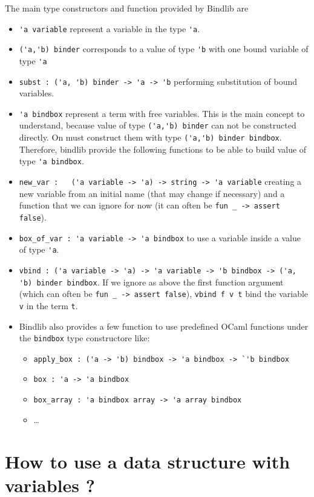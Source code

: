 \documentclass[11pt]{article}
\begin{document}
The main type constructors and function provided by Bindlib are
\begin{itemize}
\item \verb#'a variable# represent a variable in the type \verb#'a#.
\item \verb#('a,'b) binder# corresponds to a value of type \verb#'b# with one bound variable of type
  \verb#'a#
\item \verb#subst : ('a, 'b) binder -> 'a -> 'b# performing
  substitution of bound variables.
\item \verb#'a bindbox# represent a term with free variables. This is
  the main concept to understand, because value of type
  \verb#('a,'b) binder# can not be constructed directly. On must
  construct them with type \verb#('a,'b) binder bindbox#. Therefore,
  bindlib provide the following functions to be able to build value of
  type \verb#'a bindbox#.

\item \verb#new_var :   ('a variable -> 'a) -> string -> 'a variable#
  creating a new variable from an initial name (that may change if
  necessary) and a function that we can ignore for now
    (it can often be \verb#fun _ -> assert false#).

\item \verb#box_of_var : 'a variable -> 'a bindbox# to use a variable
  inside a value of type \verb#'a#.

\item
  \verb#vbind : ('a variable -> 'a) -> 'a variable -> 'b bindbox -> ('a, 'b) binder bindbox#.
  If we ignore as above the first function argument (which can often
  be \verb#fun _ -> assert false#), \verb#vbind f v t# bind the
  variable \verb#v# in the term \verb#t#.

\item Bindlib also provides a few function to use predefined OCaml
  functions under the \verb#bindbox# type constructore like:
  \begin{itemize}
  \item
    \verb#apply_box : ('a -> 'b) bindbox -> 'a bindbox -> `'b bindbox#
  \item \verb#box : 'a -> 'a bindbox#
  \item \verb#box_array : 'a bindbox array -> 'a array bindbox#
  \item …
  \end{itemize}
\end{itemize}

\section{How to use a data structure with variables ?}
\end{document}
